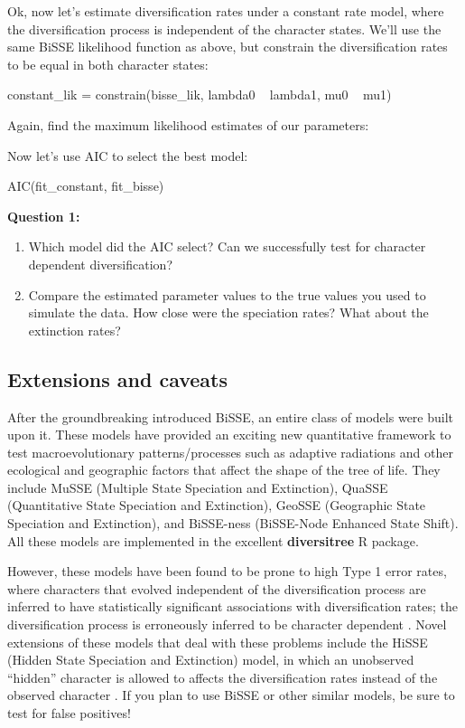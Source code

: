 \documentclass[11pt]{article}
\begin{document}
Ok, now let's estimate diversification rates under
a constant rate model, where the diversification
process is independent of the character states. 
We'll use the same BiSSE likelihood function as above,
but constrain the diversification rates to be equal
in both character states:
\begin{code}
constant_lik = constrain(bisse_lik, lambda0 ~ lambda1, mu0 ~ mu1)
\end{code}
Again, find the maximum likelihood estimates of our parameters: 

Now let's use AIC to select the best model:
\begin{code}
AIC(fit_constant, fit_bisse)
\end{code}

\begin{framed}
\noindent
\textbf{Question 1:} \\
\begin{enumerate}
\item Which model did the AIC select? Can we successfully test for character dependent diversification?
\item Compare the estimated parameter values to the true values
    you used to simulate the data. How close were the speciation rates?
    What about the extinction rates?
\end{enumerate}
\end{framed}

\subsection{Extensions and caveats}

After the groundbreaking \citet{maddison2007estimating} introduced BiSSE,
an entire class of models were built upon it. 
These models have provided an exciting new quantitative framework to
test macroevolutionary patterns/processes such as adaptive radiations
and other ecological and geographic factors that affect the shape of the tree of life.
They include
MuSSE (Multiple State Speciation and Extinction), 
QuaSSE (Quantitative State Speciation and Extinction),
GeoSSE (Geographic State Speciation and Extinction),
and BiSSE-ness (BiSSE-Node Enhanced State Shift).
All these models are implemented in the excellent \textbf{diversitree}
R package.

However, these models have been found to be prone
to high Type 1 error rates, where characters
that evolved independent of the diversification process
are inferred to have statistically significant associations 
with diversification rates; 
the diversification process is erroneously inferred to be character dependent 
\citep{rabosky2015model}.
Novel extensions of these models that deal with these problems include the HiSSE (Hidden State Speciation and Extinction)
model, in which an unobserved ``hidden'' character is allowed to affects the diversification rates instead of the observed character \citep{beaulieu2015detecting}.
If you plan to use BiSSE or other similar models, be sure to test for false positives!
\end{document}
